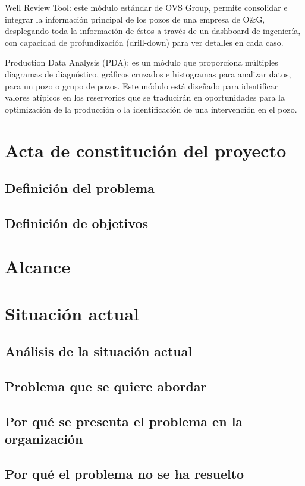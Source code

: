 Well Review Tool: este módulo estándar de OVS Group, permite consolidar e
integrar la información principal de los pozos de una empresa de O\&G,
desplegando toda la información de éstos a través de un dashboard de
ingeniería, con capacidad de profundización (drill-down) para ver detalles en
cada caso.

Production Data Analysis (PDA): es un módulo que proporciona múltiples
diagramas de diagnóstico, gráficos cruzados e histogramas para analizar datos,
para un pozo o grupo de pozos.  Este módulo está diseñado para identificar
valores atípicos en los reservorios que se traducirán en oportunidades para la
optimización de la producción o la identificación de una intervención en el
pozo.

\section{Acta de constitución del proyecto}
\label{section:acta}

\subsection{Definición del problema}
\label{subsection:problema}

\subsection{Definición de objetivos}
\label{subsection:objetivos}

\section{Alcance}
\label{section:alcance}

\section{Situación actual}
\label{section:situacion}

\subsection{Análisis de la situación actual}
\label{subsection:analisis-situacion}

\subsection{Problema que se quiere abordar}
\label{subsection:problema-situacion}

\subsection{Por qué se presenta el problema en la organización}
\label{subsection:justificacion-situacion1}

\subsection{Por qué el problema no se ha resuelto}
\label{subsection:justificacion-situacion2}
